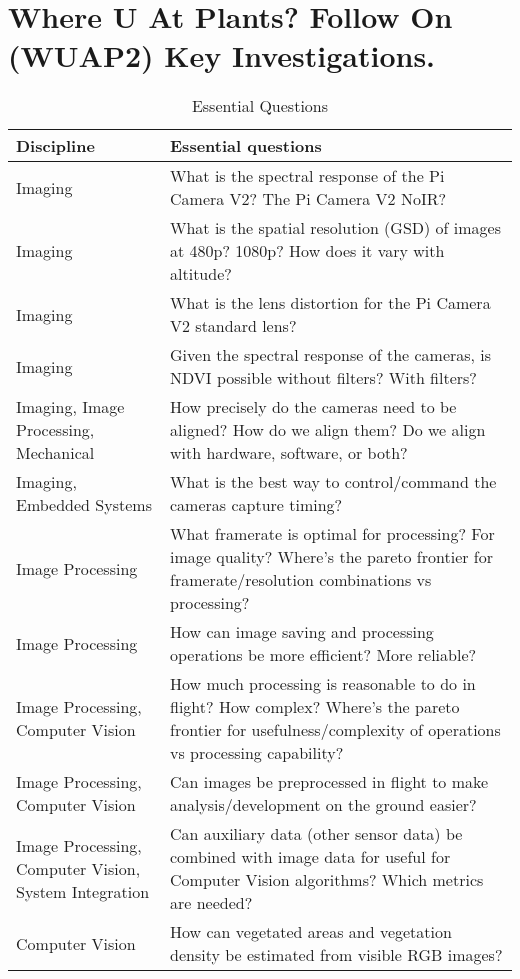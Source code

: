 \documentclass[conference]{IEEEtran} %
\begin{document}
\section{Where U At Plants? Follow On (WUAP2) Key Investigations.}
\noindent
\begin{table}[h!]
  \label{essentialquestions}
  \caption{Essential Questions}
  \centering
\begin{tabularx}{\linewidth}{@{}p{}X@{}}
    \textbf{Discipline} & \textbf{Essential questions} \\
    \midrule
    Imaging & What is the spectral response of the Pi Camera V2? The Pi Camera V2 NoIR? \\
    Imaging & What is the spatial resolution (GSD) of images at 480p? 1080p? How does it vary with altitude? \\
    Imaging & What is the lens distortion for the Pi Camera V2 standard lens? \\
    Imaging & Given the spectral response of the cameras, is NDVI possible without filters? With filters? \\
    Imaging, Image Processing, Mechanical & How precisely do the cameras need to be aligned? How do we align them? Do we align with hardware, software, or both? \\
    Imaging, Embedded Systems & What is the best way to control/command the cameras capture timing? \\
    Image Processing & What framerate is optimal for processing? For image quality? Where's the pareto frontier for framerate/resolution combinations vs processing? \\
    Image Processing & How can image saving and processing operations be more efficient? More reliable? \\
    Image Processing, Computer Vision & How much processing is reasonable to do in flight? How complex? Where's the pareto frontier for usefulness/complexity of operations vs processing capability? \\
    Image Processing, Computer Vision & Can images be preprocessed in flight to make analysis/development on the ground easier? \\
    Image Processing, Computer Vision, System Integration & Can auxiliary data (other sensor data) be combined with image data for useful for Computer Vision algorithms? Which metrics are needed? \\
    Computer Vision & How can vegetated areas and vegetation density be estimated from visible RGB images? \\

\end{tabularx}
\end{table}
\end{document}
